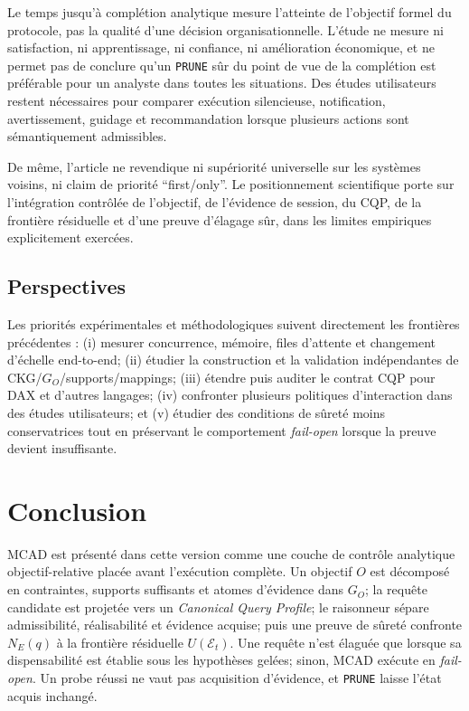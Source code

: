 \documentclass[journal]{IEEEtran}
\begin{document}
Le temps jusqu'à complétion analytique mesure l'atteinte de l'objectif formel du protocole, pas la qualité d'une décision organisationnelle. L'étude ne mesure ni satisfaction, ni apprentissage, ni confiance, ni amélioration économique, et ne permet pas de conclure qu'un \texttt{PRUNE} sûr du point de vue de la complétion est préférable pour un analyste dans toutes les situations. Des études utilisateurs restent nécessaires pour comparer exécution silencieuse, notification, avertissement, guidage et recommandation lorsque plusieurs actions sont sémantiquement admissibles.

De même, l'article ne revendique ni supériorité universelle sur les systèmes voisins, ni claim de priorité ``first/only''. Le positionnement scientifique porte sur l'intégration contrôlée de l'objectif, de l'évidence de session, du CQP, de la frontière résiduelle et d'une preuve d'élagage sûr, dans les limites empiriques explicitement exercées.

\subsection{Perspectives}

Les priorités expérimentales et méthodologiques suivent directement les frontières précédentes : (i) mesurer concurrence, mémoire, files d'attente et changement d'échelle end-to-end; (ii) étudier la construction et la validation indépendantes de CKG/$G_O$/supports/mappings; (iii) étendre puis auditer le contrat CQP pour DAX et d'autres langages; (iv) confronter plusieurs politiques d'interaction dans des études utilisateurs; et (v) étudier des conditions de sûreté moins conservatrices tout en préservant le comportement \emph{fail-open} lorsque la preuve devient insuffisante.

\begingroup
\raggedbottom
\setlength{\parskip}{0pt}
\section{Conclusion}
\label{sec:conclusion}

MCAD est présenté dans cette version comme une couche de contrôle analytique objectif-relative placée avant l'exécution complète. Un objectif $O$ est décomposé en contraintes, supports suffisants et atomes d'évidence dans $G_O$; la requête candidate est projetée vers un \emph{Canonical Query Profile}; le raisonneur sépare admissibilité, réalisabilité et évidence acquise; puis une preuve de sûreté confronte $N_E(q)$ à la frontière résiduelle $U(\mathcal{E}_t)$. Une requête n'est élaguée que lorsque sa dispensabilité est établie sous les hypothèses gelées; sinon, MCAD exécute en \emph{fail-open}. Un probe réussi ne vaut pas acquisition d'évidence, et \texttt{PRUNE} laisse l'état acquis inchangé.
\end{document}
